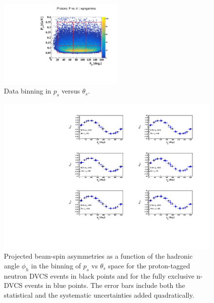 \begin{figure}[htb]
  \centering
\includegraphics[width=0.55\textwidth,clip,trim=0mm 0mm 0mm 
   20mm]{figs_epngamma/pdf/epngamma_p_p_theta.pdf}
  \caption{Data binning in $p_s$ versus $\theta_s$.
   \label{fig:ps_binning_x_t}}
\end{figure}

\begin{figure}[htb]
  \centering
    \includegraphics[width=1.1\textwidth,clip]{figs_epngamma/pdf/epngamma_BSA_incoherent_Phi.pdf}
  \caption{Projected beam-spin asymmetries as a function of the hadronic angle 
   $\phi_h$ in the binning of $p_s$ vs $\theta_s$ space for the proton-tagged 
   neutron DVCS events in black points and for the fully exclusive n-DVCS 
   events in blue points. The error bars include both the statistical and the 
   systematic uncertainties added quadratically.
   \label{fig:alu_exclusive}}
\end{figure}


